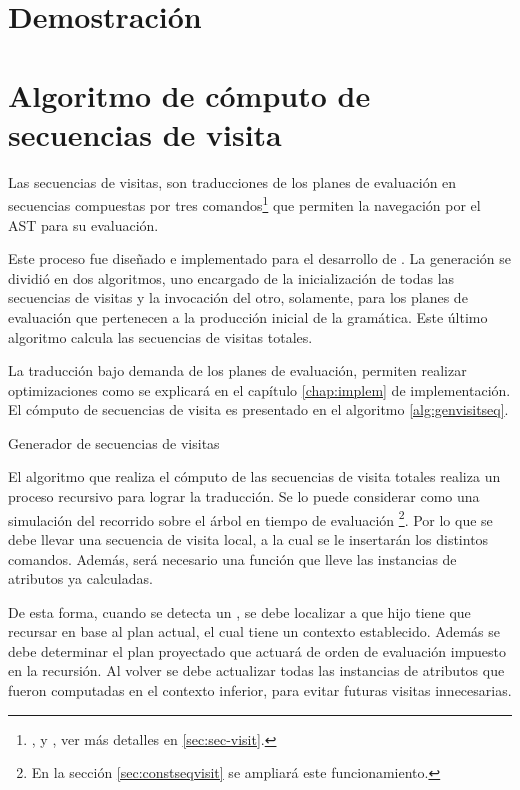 \section{Demostración}


\section{Algoritmo de cómputo de secuencias de visita}
\label{sec:algseqvisit}

Las secuencias de visitas, son traducciones de los planes de evaluación en secuencias compuestas por tres comandos\footnote{,  y , ver más detalles en \ref{sec:sec-visit}.} que permiten la navegación por el AST para su evaluación.

Este proceso fue diseñado e implementado para el desarrollo de \maggen. La generación se dividió en dos algoritmos, uno encargado de la inicialización de todas las secuencias de visitas y la invocación del otro, solamente, para los planes de evaluación que pertenecen a la producción inicial de la gramática. Este último algoritmo calcula las secuencias de visitas totales.

La traducción bajo demanda de los planes de evaluación, permiten realizar optimizaciones como se explicará en el capítulo \ref{chap:implem} de implementación. El cómputo de secuencias de visita es presentado en el algoritmo \ref{alg:genvisitseq}.

\begin{algorithm}[!ht]

\caption{\label{alg:genvisitseq} Generador de secuencias de visitas}
\end{algorithm}

El algoritmo que realiza el cómputo de las secuencias de visita totales realiza un proceso recursivo para lograr la traducción. Se lo puede considerar como una simulación del recorrido sobre el árbol en tiempo de evaluación \footnote{En la sección \ref{sec:constseqvisit} se ampliará este funcionamiento.}. Por lo que se debe llevar una secuencia de visita local, a la cual se le insertarán los distintos comandos. Además, será necesario una función que lleve las instancias de atributos ya calculadas.

De esta forma, cuando se detecta un , se debe localizar a que hijo tiene que recursar en base al plan actual, el cual tiene un contexto establecido. Además se debe determinar el plan proyectado que actuará de orden de evaluación impuesto en la recursión. Al volver se debe actualizar todas las instancias de atributos que fueron computadas en el contexto inferior, para evitar futuras visitas innecesarias.

